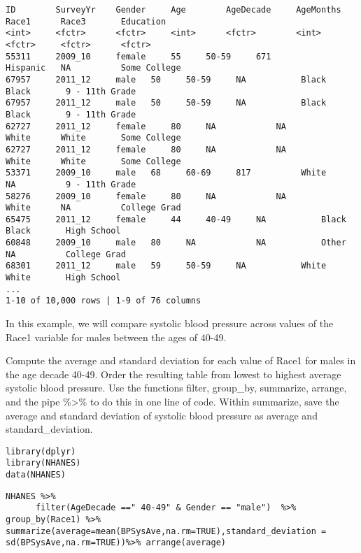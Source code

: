 \documentclass[]{article}
\begin{document}
\begin{verbatim}
ID        SurveyYr    Gender     Age        AgeDecade     AgeMonths    Race1      Race3       Education
<int>     <fctr>      <fctr>     <int>      <fctr>        <int>        <fctr>     <fctr>      <fctr>
55311     2009_10     female     55     50-59     671          Hispanic   NA          Some College  
67957     2011_12     male   50     50-59     NA           Black      Black       9 - 11th Grade    
67957     2011_12     male   50     50-59     NA           Black      Black       9 - 11th Grade    
62727     2011_12     female     80     NA            NA           White      White       Some College  
62727     2011_12     female     80     NA            NA           White      White       Some College  
53371     2009_10     male   68     60-69     817          White      NA          9 - 11th Grade    
58276     2009_10     female     80     NA            NA           White      NA          College Grad  
65475     2011_12     female     44     40-49     NA           Black      Black       High School   
60848     2009_10     male   80     NA            NA           Other      NA          College Grad  
68301     2011_12     male   59     50-59     NA           White      White       High School   
...
1-10 of 10,000 rows | 1-9 of 76 columns
\end{verbatim}

In this example, we will compare systolic blood pressure across values
of the Race1 variable for males between the ages of 40-49.

Compute the average and standard deviation for each value of Race1 for
males in the age decade 40-49. Order the resulting table from lowest to
highest average systolic blood pressure. Use the functions filter,
group\_by, summarize, arrange, and the pipe \%\textgreater{}\% to do
this in one line of code. Within summarize, save the average and
standard deviation of systolic blood pressure as average and
standard\_deviation.

\begin{verbatim}
library(dplyr)
library(NHANES)
data(NHANES)
\end{verbatim}

\begin{verbatim}
NHANES %>%
      filter(AgeDecade ==" 40-49" & Gender == "male")  %>% group_by(Race1) %>% summarize(average=mean(BPSysAve,na.rm=TRUE),standard_deviation = sd(BPSysAve,na.rm=TRUE))%>% arrange(average)
\end{verbatim}
\end{document}
